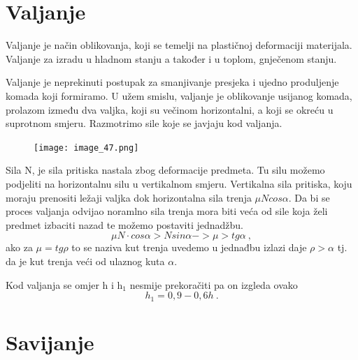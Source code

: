 \documentclass[a4paper,12pt]{article}
\numberwithin{figure}{section}
\begin{document}
\section{Valjanje}
Valjanje je način oblikovanja, koji se temelji na plastičnoj deformaciji materijala. Valjanje za izradu u hladnom stanju a također i  u toplom, gnječenom stanju.\par
Valjanje je neprekinuti postupak za smanjivanje presjeka i ujedno produljenje komada koji formiramo. U užem smislu, valjanje je oblikovanje usijanog komada, prolazom između dva valjka, koji su večinom horizontalni, a koji se okreću u suprotnom smjeru. Razmotrimo sile koje se javjaju kod valjanja.\par
\begin{figure}[!h]
\centering
\texttt{[image: image\_47.png]}
\end{figure}
\FloatBarrier
Sila N, je sila pritiska nastala zbog deformacije predmeta. Tu silu možemo podjeliti na horizontalnu silu u vertikalnom smjeru. Vertikalna sila pritiska, koju moraju prenositi ležaji valjka dok horizontalna sila trenja $\mu N cos \alpha$. Da bi se proces valjanja odvijao noramlno sila trenja mora biti veća od sile koja želi predmet izbaciti nazad te možemo postaviti jednadžbu.
\begin{equation}
\mu N\cdot cos \alpha > N sin \alpha -> \mu > tg \alpha\:,
\end{equation} 
ako za $\mu = tg\rho$ to se naziva kut trenja uvedemo u jednađbu izlazi daje $\rho>\alpha$ tj. da je kut trenja veći od ulaznog kuta $\alpha$.\par
Kod valjanja se omjer h i h$_{1}$ nesmije prekoračiti pa on izgleda ovako
\begin{equation}
h_{1}=0,9 - 0,6 h\:.
\end{equation}
\clearpage
\section{Savijanje}
\end{document}
